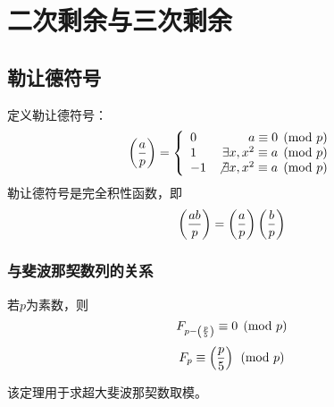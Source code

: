 \section{二次剩余与三次剩余}
\subsection{勒让德符号}
定义勒让德符号：
\begin{displaymath}
	\left(\frac{a}{p}\right)=
	\left\{\begin{array}{lr}
		0  & a\equiv 0 \pmod{p}                  \\
		1  & \exists x,x^2\equiv a \pmod{p}      \\
		-1 & \not \exists x,x^2\equiv a \pmod{p}
	\end{array}\right.
\end{displaymath}
勒让德符号是完全积性函数，即
\begin{displaymath}
	\left(\frac{ab}{p}\right)=\left(\frac{a}{p}\right)\left(\frac{b}{p}\right)
\end{displaymath}
\subsubsection{与斐波那契数列的关系}
\begin{theorem}
	若$p$为素数，则
	\begin{displaymath}
		F_{p-\left(\frac{p}{5}\right)}\equiv 0 \pmod{p}
	\end{displaymath}
	\begin{displaymath}
		F_p\equiv \left(\frac{p}{5}\right) \pmod{p}
	\end{displaymath}
\end{theorem}
该定理用于求超大斐波那契数取模。
